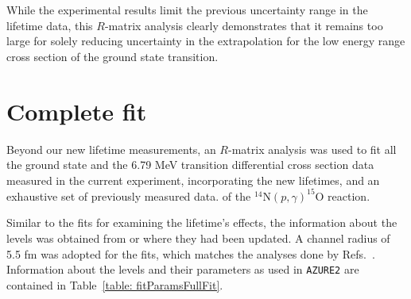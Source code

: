While the experimental results limit the previous uncertainty range in the lifetime data, this $R$-matrix analysis clearly demonstrates that it remains too large for solely reducing uncertainty in the extrapolation for the low energy range cross section of the ground state transition.

\section{Complete fit}
\label{sec: complete fit}


Beyond our new lifetime measurements, an $R$-matrix analysis was used to fit all the ground state and the 6.79 MeV transition differential cross section data measured in the current experiment, incorporating the new lifetimes, and an exhaustive set of previously measured data. of the $^{14}$N$(p,\gamma)^{15}$O reaction.

Similar to the fits for examining the lifetime's effects, the information about the levels was obtained from \citet{Ajzenberg-Selove1991} or \citet{Daigle2016} where they had been updated. A channel radius of 5.5 fm was adopted for the fits, which matches the analyses done by Refs.~\cite{Adelberger2011, Li2016, Wagner2018}. Information about the levels and their parameters as used in \texttt{AZURE2} are contained in Table~\ref{table: fitParamsFullFit}. 


